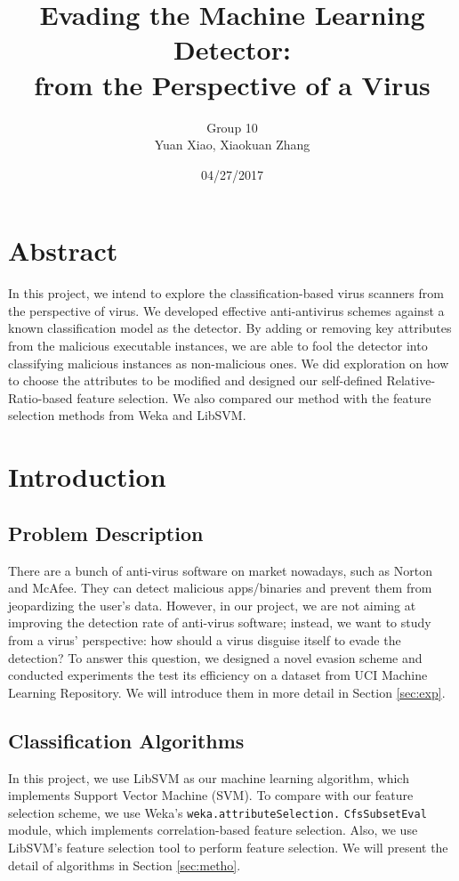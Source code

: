 \documentclass[11pt]{article}
\title{Evading the Machine Learning Detector:\\ from the Perspective of a Virus}
\author{Group 10 \\ Yuan Xiao, Xiaokuan Zhang}
\date{04/27/2017}
\begin{document}
\maketitle
\section*{Abstract}
In this project, we intend to explore the classification-based virus scanners from the perspective of virus. We developed effective anti-antivirus schemes against a known classification model as the detector. By adding or removing key attributes from the malicious executable instances, we are able to fool the detector into classifying malicious instances as non-malicious ones. We did exploration on how to choose the attributes to be modified and designed our self-defined Relative-Ratio-based feature selection. We also compared our method with the feature selection methods from Weka and LibSVM.


\section{Introduction}

\subsection{Problem Description}
There are a bunch of anti-virus software on market nowadays, such as Norton and McAfee. They can detect malicious apps/binaries and prevent them from jeopardizing the user's data. However, in our project, we are not aiming at improving the detection rate of anti-virus software; instead, we want to study from a virus' perspective: how should a virus disguise itself to evade the detection? To answer this question, we designed a novel evasion scheme and conducted experiments the test its efficiency on a dataset from UCI Machine Learning Repository. We will introduce them in more detail in Section \ref{sec:exp}.

\subsection{Classification Algorithms}
In this project, we use LibSVM \cite{CC01a} as our machine learning  algorithm, which implements Support Vector Machine (SVM). To compare with our feature selection scheme, we use Weka's \texttt{weka.attributeSelection.}
\texttt{CfsSubsetEval} module, which implements correlation-based feature selection. Also, we use LibSVM's feature selection tool to perform feature selection. We will present the detail of algorithms in Section \ref{sec:metho}.
\end{document}
